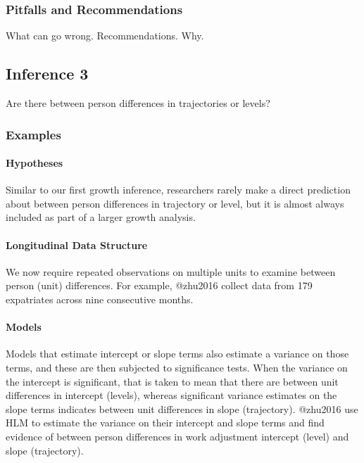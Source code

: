 \documentclass[]{article}
\let\oldparagraph\paragraph
\renewcommand{\paragraph}[1]{\oldparagraph{#1}\mbox{}}
\begin{document}
\hypertarget{pitfalls-and-recommendations-2}{%
\subsubsection{Pitfalls and
Recommendations}\label{pitfalls-and-recommendations-2}}

What can go wrong. Recommendations. Why.

\hypertarget{inference-3}{%
\subsection{Inference 3}\label{inference-3}}

Are there between person differences in trajectories or levels?

\hypertarget{examples-3}{%
\subsubsection{Examples}\label{examples-3}}

\hypertarget{hypotheses-3}{%
\paragraph{Hypotheses}\label{hypotheses-3}}

Similar to our first growth inference, researchers rarely make a direct
prediction about between person differences in trajectory or level, but
it is almost always included as part of a larger growth analysis.

\hypertarget{longitudinal-data-structure-3}{%
\paragraph{Longitudinal Data
Structure}\label{longitudinal-data-structure-3}}

We now require repeated observations on multiple units to examine
between person (unit) differences. For example, @zhu2016 collect data
from 179 expatriates across nine consecutive months.

\hypertarget{models-3}{%
\paragraph{Models}\label{models-3}}

Models that estimate intercept or slope terms also estimate a variance
on those terms, and these are then subjected to significance tests. When
the variance on the intercept is significant, that is taken to mean that
there are between unit differences in intercept (levels), whereas
significant variance estimates on the slope terms indicates between unit
differences in slope (trajectory). @zhu2016 use HLM to estimate the
variance on their intercept and slope terms and find evidence of between
person differences in work adjustment intercept (level) and slope
(trajectory).
\end{document}

